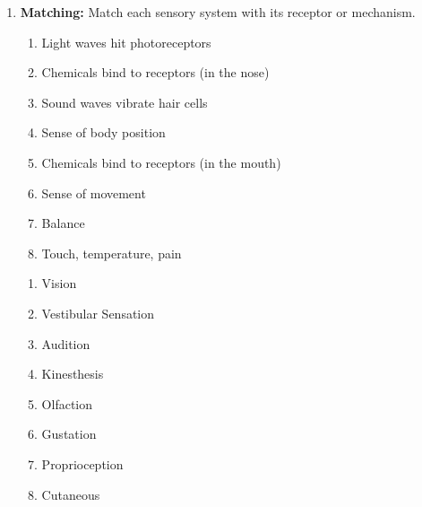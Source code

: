 \begin{enumerate}[label=\textbf{Q2.7.\arabic*}]
      \item \textbf{Matching:} Match each sensory system with its receptor or mechanism.
            \begin{wordbox}
                  \begin{enumerate}[label=(\alph*)]
                        \item Light waves hit photoreceptors
                        \item Chemicals bind to receptors (in the nose)
                        \item Sound waves vibrate hair cells
                        \item Sense of body position
                        \item Chemicals bind to receptors (in the mouth)
                        \item Sense of movement
                        \item Balance
                        \item Touch, temperature, pain
                  \end{enumerate}
            \end{wordbox}
            \begin{enumerate}[label=(\arabic*)]
                  \item Vision \quad \dotfill \quad {} \\
                  \item Vestibular Sensation \quad \dotfill \quad {} \\
                  \item Audition \quad \dotfill \quad {} \\
                  \item Kinesthesis \quad \dotfill \quad {} \\
                  \item Olfaction \quad \dotfill \quad {} \\
                  \item Gustation \quad \dotfill \quad {} \\
                  \item Proprioception \quad \dotfill \quad {} \\
                  \item Cutaneous \quad \dotfill \quad {} 
            \end{enumerate}
                        

\end{enumerate}
